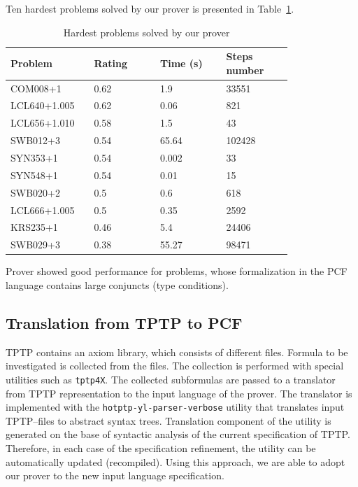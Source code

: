 \documentclass[runningheads,a4paper]{llncs}
\begin{document}
Ten hardest problems solved by our prover is presented in Table~\ref{tbl:2}.
\begin{table}
\caption{Hardest problems solved by our prover}\label{tbl:2}
\begin{tabular}{|p{0.2\linewidth}|p{0.2\linewidth}|p{0.2\linewidth}|p{0.2\linewidth}|}

\hline
\textbf{Problem} & \textbf{Rating} & \textbf{Time (s)} & \textbf{Steps number} \\
\hline
COM008+1 & 0.62 & 1.9 & 33551 \\
\hline
LCL640+1.005 &  0.62 &  0.06 &  821 \\
\hline
LCL656+1.010 &  0.58 &  1.5 &  43 \\
\hline
SWB012+3 &  0.54 &  65.64 &  102428 \\
\hline
SYN353+1 &  0.54 &  0.002 &  33 \\
\hline
SYN548+1 &  0.54 &  0.01 &  15 \\
\hline
SWB020+2 &  0.5 &  0.6 &  618 \\
\hline
LCL666+1.005 &  0.5 &  0.35 &  2592 \\
\hline
KRS235+1 & 0.46 & 5.4 & 24406 \\
\hline
SWB029+3 &  0.38 &  55.27 &  98471 \\
\hline
\end{tabular}
\end{table}


Prover showed good performance for problems, whose formalization in the PCF language contains large conjuncts (type conditions).

\subsection{Translation from TPTP to PCF}
TPTP contains an axiom library, which consists of different files. Formula to be investigated is collected from the files. The collection is performed with special utilities such as \texttt{tptp4X}. The collected subformulas are passed to a translator from TPTP representation to the input language of the prover. The translator is implemented with the \texttt{hotptp-yl-parser-verbose} \cite{TPTPTrans} utility that translates input TPTP--files to abstract syntax trees. Translation component of the utility is generated on the base of syntactic analysis of the current specification of TPTP. Therefore, in each case of the specification refinement, the utility can be automatically updated (recompiled). Using this approach, we are able to adopt our prover to the new input language specification.
\end{document}
